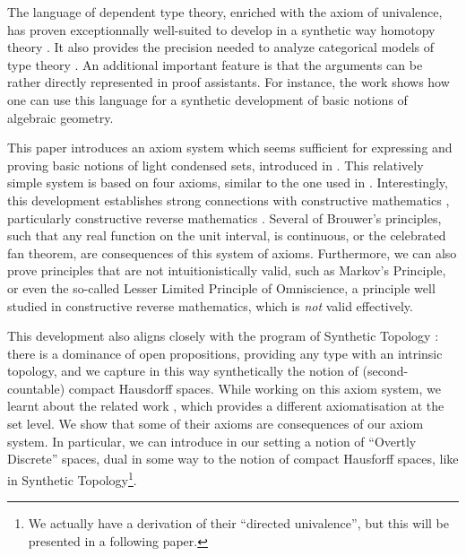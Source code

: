 The language of dependent type theory, enriched with the axiom of univalence, has proven exceptionnally well-suited to
develop in a synthetic way homotopy theory \cite{hott}. It also provides
the precision needed to analyze categorical models of type theory \cite{vanderweide2024}. An additional
important feature is that
the arguments can be rather directly represented in proof assistants. For instance, the work \cite{draft} shows how one can use
this language for a synthetic development of basic notions of algebraic geometry.

This paper introduces
an axiom system which seems sufficient for expressing and proving basic notions of light condensed
sets, introduced in \cite{Scholze}.
This relatively simple system is based on four axioms, similar to the one used
in \cite{draft}. Interestingly, this development establishes strong connections with constructive mathematics \cite{Bishop},
particularly constructive reverse mathematics \cite{ReverseMathsBishop,HannesDiener}. Several of Brouwer's principles, such that
any real function on the unit interval, is continuous, or the celebrated fan theorem, are consequences of this system
of axioms. Furthermore, we can also prove principles that are not intuitionistically valid, such as Markov's Principle,
or even the so-called Lesser Limited Principle of Omniscience, a principle well studied in constructive reverse mathematics,
which is {\em not} valid effectively.

This development also aligns closely with the program of Synthetic
Topology \cite{SyntheticTopologyEscardo,SyntheticTopologyLesnik}:
there is a dominance of open propositions, providing any type with an intrinsic
topology, and we capture in this way synthetically the notion of (second-countable) compact Hausdorff spaces.
While working on this axiom system, we learnt about the related work \cite{bc24}, which provides a different axiomatisation
at the set level. We show that some of their axioms are consequences of our axiom system. In particular, we can introduce
in our setting a notion of ``Overtly Discrete'' spaces, dual in some way to the notion of compact Hausforff spaces, like
in Synthetic Topology\footnote{We actually have a
derivation of their ``directed univalence'', but this will be presented in a following paper.}.


